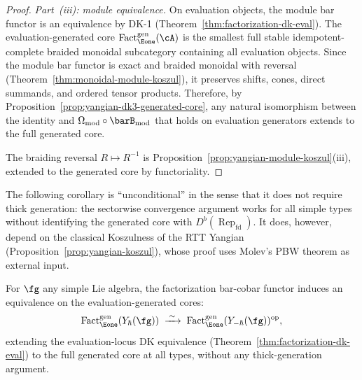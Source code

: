 \begin{proof}
\emph{Part~(iii): module equivalence.}
On evaluation objects, the module bar functor is an equivalence by
DK-1 (Theorem~\ref{thm:factorization-dk-eval}).  The
evaluation-generated core
$\operatorname{Fact}_{\Eone}^{\mathrm{gen}}(\cA)$ is the
smallest full stable idempotent-complete braided monoidal subcategory
containing all evaluation objects.  Since the module bar functor
is exact and braided monoidal with reversal
(Theorem~\ref{thm:monoidal-module-koszul}), it preserves shifts,
cones, direct summands, and ordered tensor products.  Therefore, by
Proposition~\ref{prop:yangian-dk3-generated-core}, any natural
isomorphism between the identity and
$\Omega_{\mathrm{mod}} \circ \barB_{\mathrm{mod}}$ that holds on
evaluation generators extends to the full generated core.

The braiding reversal $R \mapsto R^{-1}$ is
Proposition~\ref{prop:yangian-module-koszul}(iii), extended to the
generated core by functoriality.
\end{proof}

\begin{remark}
\label{rem:dk23-unconditional-scope}
The following corollary is ``unconditional'' in the sense that it
does not require thick generation: the sectorwise convergence
argument works for all simple types without identifying the
generated core with $D^b(\operatorname{Rep}_{\mathrm{fd}})$.
It does, however, depend on the classical Koszulness of the RTT
Yangian (Proposition~\ref{prop:yangian-koszul}), whose proof
uses Molev's PBW theorem \cite{molev-yangians} as external input.
\end{remark}

\begin{corollary}
\label{cor:dk23-all-types}
For $\fg$ any simple Lie algebra, the factorization bar-cobar
functor induces an equivalence on the evaluation-generated cores:
\begin{equation}\label{eq:dk23-all-types}
\operatorname{Fact}_{\Eone}^{\mathrm{gen}}
  (Y_\hbar(\fg))
\;\xrightarrow{\;\sim\;}\;
\operatorname{Fact}_{\Eone}^{\mathrm{gen}}
  (Y_{-\hbar}(\fg))^{\mathrm{op}},
\end{equation}
extending the evaluation-locus DK equivalence
\textup{(}Theorem~\textup{\ref{thm:factorization-dk-eval}}\textup{)}
to the full generated core at all types, without any
thick-generation argument.
\end{corollary}

